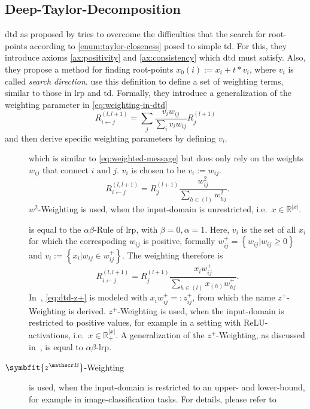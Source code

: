 \subsection{Deep-Taylor-Decomposition}\label{subsect:dtd}
\gls{dtd} as proposed by  tries to overcome the difficulties that the search for root-points according to \cref{enum:taylor-closeness} posed to simple \gls{td}. For this, they introduce axioms \ref{ax:positivity} and \ref{ax:consistency} which \gls{dtd} must satisfy. Also, they propose a method for finding root-points \(x_0(i):= x_i + t*v_i\), where \(v_i\) is called \textit{search direction}. \citeauthor{Montavon.2017} use this definition to define a set of weighting terms, similar to those in \gls{lrp} and \gls{td}. Formally, they introduce a generalization of the weighting parameter in \cref{eq:weighting-in-dtd}\cite[see][Supplementary Material]{Montavon.2017}
\begin{equation}
    R_{i\leftarrow j}^{(l,l+1)} = \sum_j \frac{v_i w_{ij}}{\sum_i v_i w_{ij}} R_j^{(l+1)}\label{eq:weighting-in-dtd}
\end{equation}
and then derive specific weighting parameters by defining \(v_i\).
\begin{description}
    \item[] which is similar to \cref{eq:weighted-message} but does only rely on the weights \(w_{ij}\) that connect \(i \text{ and } j\). \(v_i\) is chosen to be \(v_i:=w_{ij}\).
    \begin{equation}
        R_{i\leftarrow j}^{(l,l+1)} = R_{j}^{(l+1)} \frac{w_{ij}^2}{\sum_{h\in (l)} w_{hj}^2}.\label{eq:w2-weighting-dtd}
    \end{equation}
    \(w^2\)-Weighting is used, when the input-domain is unrestricted, i.e.\ \(x\in \mathbb R^{|x|}\).
    \item[] is equal to the \(\alpha\beta\)-Rule of \gls{lrp}, with \(\beta=0, \alpha=1\). Here, \(v_i\) is the set of all \(x_i\) for which the correspoding \(w_{ij}\) is positive, formally \(w_{ij}^{+} = \left\{w_{ij} | w_{ij}\geq 0\right\}\) and \(v_i:=\left\{x_i|w_{ij}\in w_{ij}^{+}\right\}\). The weighting therefore is
    \begin{equation}
        R_{i\leftarrow j}^{(l,l+1)} = R_{j}^{(l+1)} \frac{x_i w_{ij}^{+}}{\sum_{h\in (l)} x_(h) w_{hj}^{+}}.\label{eq:dtd-z+}
    \end{equation}
    In~\cite{Montavon.2017}, \cref{eq:dtd-z+} is modeled with \(x_i w_{ij}^{+}=:z_{ij}^{+}\), from which the name \(z^{+}\)-Weighting is derived.
    \(z^{+}\)-Weighting is used, when the input-domain is restricted to positive values, for example in a setting with ReLU-activations, i.e.\ \(x\in \mathbb R_{+}^{|x|}\). A generalization of the \(z^{+}\)-Weighting, as discussed in~\cite{Montavon.2017}, is equal to \(\alpha\beta\)-\gls{lrp}.
    \item[\(\symbfit{z^{\mathscr B}}\)-Weighting] is used, when the input-domain is restricted to an upper- and lower-bound, for example in image-classification tasks. For details, please refer to~\cite[215\psq]{Montavon.2017}
\end{description}
